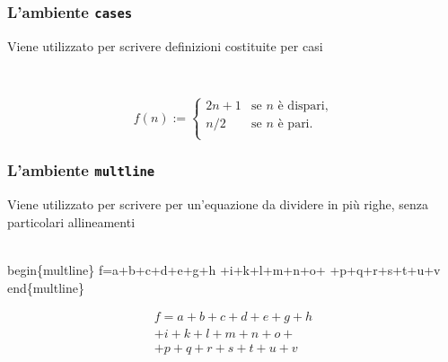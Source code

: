 \begin{frame}
  \frametitle{L'ambiente \texttt{cases}}
	Viene utilizzato per scrivere definizioni costituite per casi
	\begin{LaTeXcode}
		\\[\n
		f(n):=\n
		\alert{\\begin\{cases\}} \n
		\hspace*{5ex} 2n+1 \& \\text\{se \$n\$ \`e dispari,\}\bs\bs\n
		\hspace*{5ex} n/2  \& \\text\{se \$n\$ \`e pari.\}\bs\bs\n
		\alert{\\end\{cases\}} \n
		\\]
	\end{LaTeXcode}
	\begin{LaTeXoutput}
		\[
		f(n):=
		\begin{cases} 
		2n+1 & \text{se $n$ \`e dispari,}\\ 
		n/2  & \text{se $n$ \`e pari.} \\
		\end{cases}
		\]
	\end{LaTeXoutput}
\end{frame}
\begin{frame}
  \frametitle{L'ambiente \texttt{multline}}
	Viene utilizzato per scrivere per un'equazione da dividere in pi\`u righe, senza particolari allineamenti
	\begin{LaTeXcode}
		\alert{\\begin\{multline\}}\n
		\hspace*{5ex} f=a+b+c+d+e+g+h \bs\bs\n
		\hspace*{5ex} +i+k+l+m+n+o+\bs\bs\n
		\hspace*{5ex} +p+q+r+s+t+u+v \n
		\alert{\\end\{multline\}} 
	\end{LaTeXcode}
	\begin{LaTeXoutput}
		\begin{multline} 
		f=a+b+c+d+e+g+h \\ 
		+i+k+l+m+n+o+\\ 
		+p+q+r+s+t+u+v 
		\end{multline} 
	\end{LaTeXoutput}
\end{frame}
